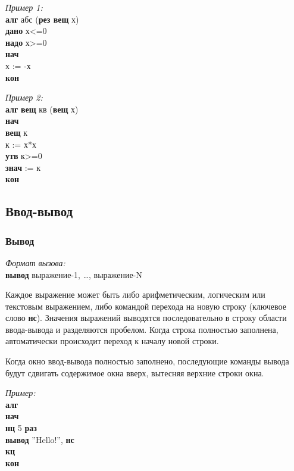 \emph{Пример 1:}\\
{\sffamily
\textbf{алг} абс (\textbf{рез вещ} х)\\
\textbf{дано} х<=0\\
\textbf{надо} х>=0\\
\textbf{нач}\\
\otstup х := -х\\
\textbf{кон}
}

\emph{Пример 2:}\\
{\sffamily
\textbf{алг} \textbf{вещ} кв (\textbf{вещ} х)\\
\textbf{нач}\\
\otstup \textbf{вещ} к\\
\otstup к := х*х\\
\otstup \textbf{утв} к>=0\\
\otstup \textbf{знач} := к\\
\textbf{кон}
}

\subsection{Ввод-вывод}

\subsubsection{Вывод}

\emph{Формат вызова:}\\
\textsf{\textbf{вывод} выражение-1, \dots, выражение-N}
	
	Каждое выражение может быть либо арифметическим, логическим или текстовым выражением, либо командой перехода на новую строку (ключевое слово \textbf{нс}). Значения выражений выводятся последовательно в строку области ввода-вывода и разделяются пробелом. Когда строка полностью заполнена, автоматически происходит переход к началу новой строки. 

	Когда окно ввод-вывода полностью заполнено, последующие команды вывода будут сдвигать содержимое окна вверх, вытесняя верхние строки окна. 

\emph{Пример:}\\
{\sffamily
\textbf{алг}\\
\textbf{нач}\\
\otstup \textbf{нц} 5 \textbf{раз}\\
\otstup \otstup \textbf{вывод} ''Hello!'', \textbf{нс}\\
\otstup \textbf{кц}\\
\textbf{кон}
}

